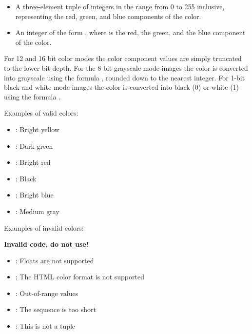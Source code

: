 \begin{itemize}
\item A three-element tuple of integers in the range from 0 to 255 inclusive, representing the red, green, and blue components of the color.
\item An integer of the form , where  is the red,  the green, and  the blue component of the color. 
\end{itemize}
For 12 and 16 bit color modes the color component values are simply 
truncated to the lower bit depth. For the 8-bit grayscale mode images the 
color is converted into grayscale using the formula , rounded 
down to the nearest integer. For 1-bit black and white mode images the color 
is converted into black (0) or white (1) using the formula .

Examples of valid colors:

\begin{itemize}
\item {}: Bright yellow
\item {}: Dark green
\item {}: Bright red
\item {}: Black
\item {}: Bright blue
\item {}: Medium gray
\end{itemize}

Examples of invalid colors:

\textbf{Invalid code, do not use!}
\begin{itemize}
\item {}: Floats are not supported
\item {}: The HTML color format is not supported
\item {}: Out-of-range values
\item {}: The sequence is too short
\item \code{[128,128,192]}: This is not a tuple
\end{itemize}

